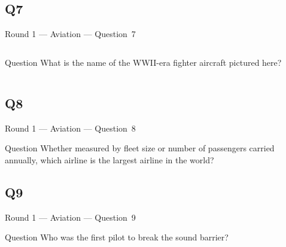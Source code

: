 \documentclass[11pt]{beamer}
\begin{document}
\subsection*{Q7}
\begin{frame}[t]{Round 1 --- Aviation --- \mbox{Question 7}}
\vspace{-0.5em}
\begin{columns}[T,totalwidth=\linewidth]
\begin{column}{0.32\linewidth}
\begin{block}{Question}
What is the name of the WWII-era fighter aircraft pictured here?
\end{block}
\end{column}
\begin{column}{0.65\linewidth}
\begin{center}
\texttt{[image: \{Images/spitfire]}.jpg}
\end{center}
\end{column}
\end{columns}
\end{frame}
\subsection*{Q8}
\begin{frame}[t]{Round 1 --- Aviation --- \mbox{Question 8}}
\vspace{-0.5em}
\begin{block}{Question}
Whether measured by fleet size or number of passengers carried annually, which airline is the largest airline in the world?
\end{block}
\end{frame}
\subsection*{Q9}
\begin{frame}[t]{Round 1 --- Aviation --- \mbox{Question 9}}
\vspace{-0.5em}
\begin{block}{Question}
Who was the first pilot to break the sound barrier?
\end{block}
\end{frame}
\end{document}
